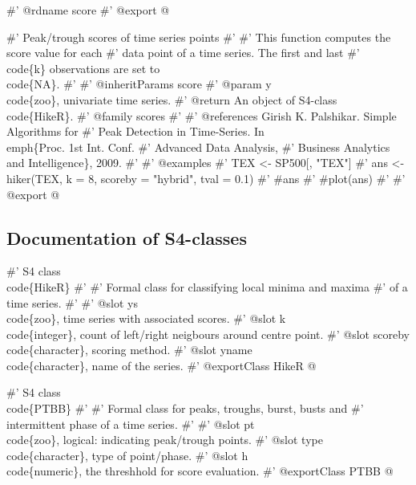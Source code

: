 \documentclass[a4paper]{article}
\begin{document}
#' @rdname score
#' @export
\nwendcode{}@

\nwenddocs{}\endmoddef
#' Peak/trough scores of time series points
#'
#' This function computes the score value for each
#' data point of a time series. The first and last
#' \\code\{k\} observations are set to \\code\{NA\}.
#'
#' @inheritParams score
#' @param y \\code\{zoo\}, univariate time series.
#' @return An object of S4-class \\code\{HikeR\}.
#' @family scores
#'
#' @references Girish K. Palshikar. Simple Algorithms for
#' Peak Detection in Time-Series. In \\emph\{Proc. 1st Int. Conf.
#' Advanced Data Analysis,
#' Business Analytics and Intelligence\}, 2009.
#'
#' @examples
#' TEX <- SP500[, "TEX"]
#' ans <- hiker(TEX, k = 8, scoreby = "hybrid", tval = 0.1)
#' #ans
#' #plot(ans)
#'
#' @export
\nwendcode{}@


\subsection{Documentation of S4-classes}

\nwenddocs{}\endmoddef
#' S4 class \\code\{HikeR\}
#'
#' Formal class for classifying local minima and maxima
#' of a time series.
#'
#' @slot ys \\code\{zoo\}, time series with associated scores.
#' @slot k \\code\{integer\}, count of left/right neigbours around centre point.
#' @slot scoreby \\code\{character\}, scoring method.
#' @slot yname \\code\{character\}, name of the series.
#' @exportClass HikeR
\nwendcode{}@

\nwenddocs{}\endmoddef
#' S4 class \\code\{PTBB\}
#'
#' Formal class for peaks, troughs, burst, busts and
#' intermittent phase of a time series.
#'
#' @slot pt \\code\{zoo\}, logical: indicating peak/trough points.
#' @slot type \\code\{character\}, type of point/phase.
#' @slot h \\code\{numeric\}, the threshhold for score evaluation.
#' @exportClass PTBB
\nwendcode{}@
\end{document}
